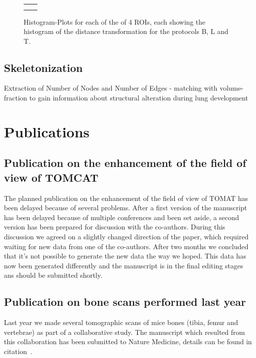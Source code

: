 \documentclass[a4paper,twoside,english,DIV=calc]{scrartcl}
\newcommand{\imsize}{\linewidth}
\begin{document}
\renewcommand{\imsize}{.309\columnwidth}
\begin{figure}[htp]
	\centering
	\begin{tabular}{cc}
		&%
		\\%
		&%
	\end{tabular}
	\caption{Histogram-Plots for each of the of 4 ROIs, each showing the histogram of the distance transformation for the protocols B, L and T.}%
	\label{fig:DTFplots}
\end{figure}

\subsection{Skeletonization}
Extraction of Number of Nodes and Number of Edges - matching with volume-fraction to gain information about structural alteration during lung development

\section{Publications}\label{sec:publications}
\subsection{Publication on the enhancement of the field of view of TOMCAT}
The planned publication on the enhancement of the field of view of TOMAT has been delayed because of several problems. After a first version of the manuscript has been delayed because of multiple conferences and been set aside, a second version has been prepared for discussion with the co-authors. During this discussion we agreed on a slightly changed direction of the paper, which required waiting for new data from one of the co-authors. After two months we concluded that it's not possible to generate the new data the way we hoped. This data has now been generated differently and the manuscript is in the final editing stages ans should be submitted shortly.

\subsection{Publication on bone scans performed last year}
Last year we made several tomographic scans of mice bones (tibia, femur and vertebrae) as part of a collaborative study. The manuscript which resulted from this collaboration has been submitted to Nature Medicine, details can be found in citation~\cite{Sausbier2009b}.



\end{document}
